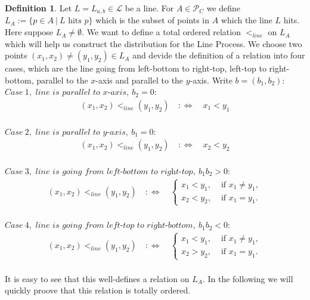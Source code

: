 \documentclass[12pt,a4paper]{scrartcl}
\numberwithin{equation}{section}
\numberwithin{equation}{section}%
\theoremstyle{definition}
\newtheorem{definition}[theorem]{Definition}
\theoremstyle{definition}
\begin{document}
\begin{definition}
	Let $L=L_{a,b}\in \mathcal{L}$ be a line. For $A\in \mathcal{P}_C$ we define $L_{A} := \{ p\in A\ |\ L \text{ hits } p\}$ which is the subset of points in $A$ which the line $L$ hits. Here suppose $L_A \neq \emptyset$. We want to define a total ordered relation $<_{line}$ on $L_A$ which will help us construct the distribution for the Line Process. We choose two points $(x_1,x_2)\neq(y_1,y_2)\in L_A$ and devide the definition of a relation into four cases, which are the line going from left-bottom to right-top, left-top to right-bottom, parallel to the $x$-axis and parallel to the $y$-axis. Write $b=(b_1,b_2)$:  \\
	$\mathit{Case\ 1,\text{ line is parallel to x-axis},\ b_2=0}$:
	\begin{align*}
	(x_1, x_2) <_{line} (y_1, y_2) \quad :\Leftrightarrow \quad x_1 < y_1
	\end{align*}\\
	$\mathit{Case\ 2, \text{ line is parallel to y-axis},\ b_1=0}$:
	\begin{align*}
	(x_1, x_2) <_{line} (y_1, y_2) \quad :\Leftrightarrow \quad x_2 < y_2
	\end{align*}\\
	$\mathit{Case\ 3, \text{ line is going from left-bottom to right-top},\ b_1b_2>0}$:
	\begin{align*}
	(x_1, x_2) <_{line} (y_1, y_2) \quad :\Leftrightarrow \quad
		\begin{cases}
			x_1 < y_1, & \text{ if } x_1 \neq y_1, \\
			x_2 < y_2, & \text{ if } x_1 = y_1.
		\end{cases}
	\end{align*}\\
	$\mathit{Case\ 4, \text{ line is going from left-top to right-bottom},\ b_1b_2<0}$:
	\begin{align*}
	(x_1, x_2) <_{line} (y_1, y_2) \quad :\Leftrightarrow \quad
	\begin{cases}
	x_1 < y_1, & \text{ if } x_1 \neq y_1, \\
	x_2 > y_2, & \text{ if } x_1 = y_1.
	\end{cases}
	\end{align*}\\
	It is easy to see that this well-defines a relation on $L_A$. In the following we will quickly proove that this relation is totally ordered. 
\end{definition}
\end{document}
